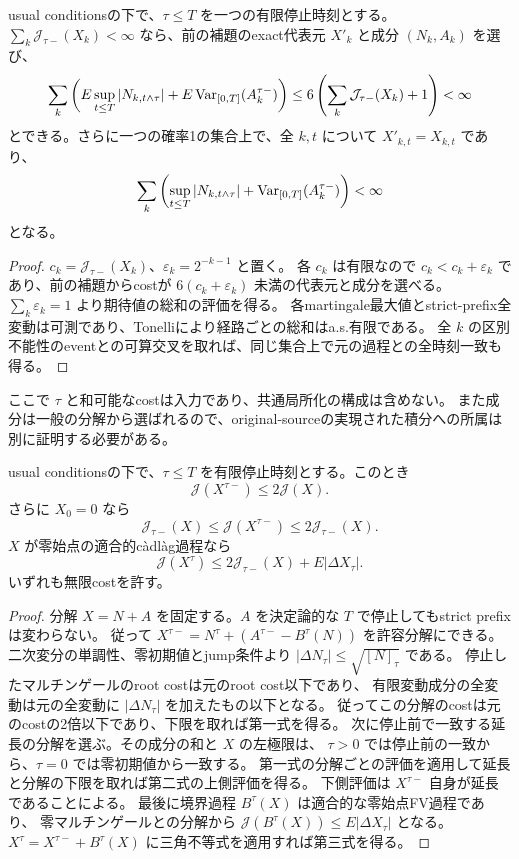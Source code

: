 \begin{lemma}[和可能なcostからの成分列]
usual conditionsの下で、$\tau\le T$ を一つの有限停止時刻とする。
$\sum_k\mathcal J_{\tau-}(X_k)<\infty$ なら、前の補題のexact代表元 $X'_k$ と成分 $(N_k,A_k)$ を選び、
\[
 \sum_k\left(E\sup_{t\le T}|N_{k,t\wedge\tau}|
       +E\operatorname{Var}_{[0,T]}(A_k^{\tau-})\right)
 \le6\left(\sum_k\mathcal J_{\tau-}(X_k)+1\right)<\infty
\]
とできる。さらに一つの確率1の集合上で、全 $k,t$ について $X'_{k,t}=X_{k,t}$ であり、
\[
 \sum_k\left(\sup_{t\le T}|N_{k,t\wedge\tau}|
       +\operatorname{Var}_{[0,T]}(A_k^{\tau-})\right)<\infty
\]
となる。
\end{lemma}
\begin{proof}
$c_k=\mathcal J_{\tau-}(X_k)$、$\varepsilon_k=2^{-k-1}$ と置く。
各 $c_k$ は有限なので $c_k<c_k+\varepsilon_k$ であり、前の補題からcostが
$6(c_k+\varepsilon_k)$ 未満の代表元と成分を選べる。
$\sum_k\varepsilon_k=1$ より期待値の総和の評価を得る。
各martingale最大値とstrict-prefix全変動は可測であり、Tonelliにより経路ごとの総和はa.s.有限である。
全 $k$ の区別不能性のeventとの可算交叉を取れば、同じ集合上で元の過程との全時刻一致も得る。
\end{proof}
ここで $\tau$ と和可能なcostは入力であり、共通局所化の構成は含めない。
また成分は一般の分解から選ばれるので、original-sourceの実現された積分への所属は別に証明する必要がある。

\begin{lemma}[停止直前の比較と境界jump]
usual conditionsの下で、$\tau\le T$ を有限停止時刻とする。このとき
\[
 \mathcal J(X^{\tau-})\le2\mathcal J(X).
\]
さらに $X_0=0$ なら
\[
 \mathcal J_{\tau-}(X)\le\mathcal J(X^{\tau-})\le2\mathcal J_{\tau-}(X).
\]
$X$ が零始点の適合的c\`adl\`ag過程なら
\[
 \mathcal J(X^\tau)\le2\mathcal J_{\tau-}(X)+E|\Delta X_\tau|.
\]
いずれも無限costを許す。
\end{lemma}
\begin{proof}
分解 $X=N+A$ を固定する。$A$ を決定論的な $T$ で停止してもstrict prefixは変わらない。
従って $X^{\tau-}=N^\tau+(A^{\tau-}-B^\tau(N))$ を許容分解にできる。
二次変分の単調性、零初期値とjump条件より
$|\Delta N_\tau|\le\sqrt{[N]_\tau}$ である。
停止したマルチンゲールのroot costは元のroot cost以下であり、
有限変動成分の全変動は元の全変動に $|\Delta N_\tau|$ を加えたもの以下となる。
従ってこの分解のcostは元のcostの2倍以下であり、下限を取れば第一式を得る。
次に停止前で一致する延長の分解を選ぶ。その成分の和と $X$ の左極限は、
$\tau>0$ では停止前の一致から、$\tau=0$ では零初期値から一致する。
第一式の分解ごとの評価を適用して延長と分解の下限を取れば第二式の上側評価を得る。
下側評価は $X^{\tau-}$ 自身が延長であることによる。
最後に境界過程 $B^\tau(X)$ は適合的な零始点FV過程であり、
零マルチンゲールとの分解から $\mathcal J(B^\tau(X))\le E|\Delta X_\tau|$ となる。
$X^\tau=X^{\tau-}+B^\tau(X)$ に三角不等式を適用すれば第三式を得る。
\end{proof}

